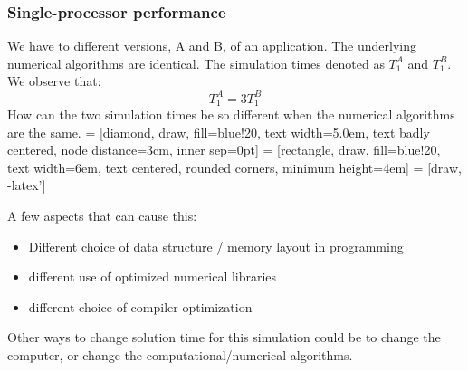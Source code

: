 \documentclass{article}
\begin{document}
\subsubsection{Single-processor performance}
We have to different versions, A and B, of an application. The underlying numerical algorithms are identical. The simulation times denoted as $T_{1}^A$ and $T_{1}^B$. We observe that: 
\begin{equation}
T_{1}^A = 3T_{1}^B
\end{equation}
How can the two simulation times be so different when the numerical algorithms are the same.
 = [diamond, draw, fill=blue!20, 
    text width=5.0em, text badly centered, node distance=3cm, inner sep=0pt]
 = [rectangle, draw, fill=blue!20,
    text width=6em, text centered, rounded corners, minimum height=4em]
 = [draw, -latex']
\newline
{}
\newline
A few aspects that can cause this: \begin{itemize}
\item Different choice of data structure / memory layout in programming
\item different use of optimized numerical libraries
\item different choice of compiler optimization
\end{itemize}
Other ways to change solution time for this simulation could be to change the computer, or change the computational/numerical algorithms.
\end{document}
